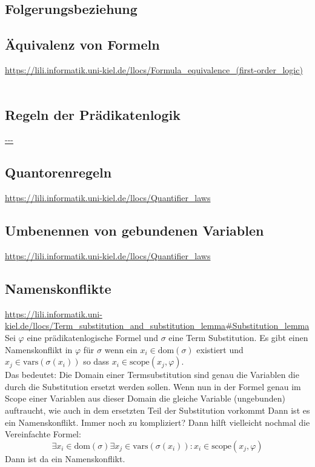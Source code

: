 \documentclass{article}
\begin{document}
    \subsection{Folgerungsbeziehung}\subsection{Äquivalenz von Formeln}
    \url{https://lili.informatik.uni-kiel.de/llocs/Formula_equivalence_(first-order_logic)}\\\\

    \subsection{Regeln der Prädikatenlogik}
    \url{---}\\

    \subsection{Quantorenregeln}
    \url{https://lili.informatik.uni-kiel.de/llocs/Quantifier_laws}\\

    \subsection{Umbenennen von gebundenen Variablen}
    \url{https://lili.informatik.uni-kiel.de/llocs/Quantifier_laws}\\
    
    \subsection{Namenskonflikte}
    \url{https://lili.informatik.uni-kiel.de/llocs/Term_substitution_and_substitution_lemma#Substitution_lemma}\\
    Sei $\varphi$ eine prädikatenlogische Formel und  $\sigma$ eine Term Substitution. Es gibt einen Namenskonflikt in $\varphi$ für $\sigma$ wenn ein $x_i \in \text{dom}(\sigma)$ existiert und $x_j \in \text{vars}(\sigma(x_i))$ so dass $x_i \in \text{scope}(x_j, \varphi)$.\\
    Das bedeutet: Die Domain einer Termsubstitution sind genau die Variablen die durch die Substitution ersetzt werden sollen. Wenn nun in der Formel genau im Scope einer Variablen aus dieser Domain die gleiche Variable (ungebunden) auftraucht, wie auch in dem ersetzten Teil der Substitution vorkommt Dann ist es ein Namenskonflikt. Immer noch zu kompliziert? Dann hilft vielleicht nochmal die Vereinfachte Formel:
    $$ \exists x_i \in \text{dom}(\sigma) \exists x_j \in \text{vars}(\sigma (x_i)): x_i \in \text{scope}(x_j,\varphi)$$
    Dann ist da ein Namenskonflikt.
\end{document}
